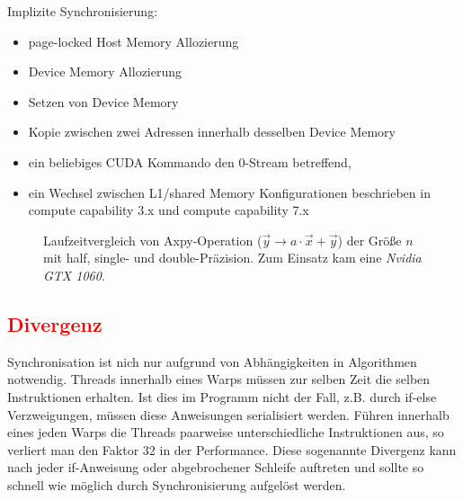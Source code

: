 		Implizite Synchronisierung:
		\begin{itemize}
        	\item page-locked Host Memory Allozierung
			\item Device Memory Allozierung
			\item Setzen von Device Memory 
			\item Kopie zwischen zwei Adressen innerhalb desselben Device Memory
			\item ein beliebiges CUDA Kommando den 0-\Gls{Stream} betreffend,
			\item ein Wechsel zwischen L1/\gls{shared Memory} Konfigurationen beschrieben in \gls{compute capability} 3.x und \gls{compute capability} 7.x
		\end{itemize}
		
		\begin{figure}[h]
  		\centering
  		\caption[Axpy mit verschiedenen Präzisionen]{Laufzeitvergleich von Axpy-Operation ($\vec{y}\rightarrow a\cdot\vec{x}+\vec{y}$) der Grö\ss e $n$ mit half, single- und double-Präzision. Zum Einsatz kam eine \textit{Nvidia GTX 1060}.}
  		\label{fig3:axpy}
		\end{figure}
		
		
		\subsection*{\textcolor{red}{Divergenz}}
		Synchronisation ist nich nur aufgrund von Abhängigkeiten in Algorithmen notwendig. \Glspl{Thread} innerhalb eines \Glspl{Warp} müssen zur selben Zeit die selben Instruktionen erhalten. Ist dies im Programm nicht der Fall, z.B. durch if-else Verzweigungen, müssen diese Anweisungen serialisiert werden. Führen innerhalb eines jeden \Glspl{Warp} die \Glspl{Thread} paarweise unterschiedliche Instruktionen aus, so verliert man den Faktor 32 in der \Gls{Performance}. Diese sogenannte Divergenz kann nach jeder if-Anweisung oder abgebrochener Schleife auftreten und sollte so schnell wie möglich durch Synchronisierung aufgelöst werden. 
		
